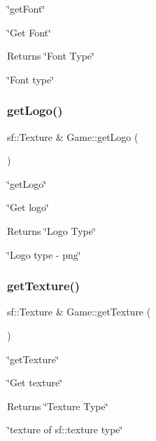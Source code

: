 \char`\"{}get\+Font\char`\"{} 

\char`\"{}\+Get Font\char`\"{}

\begin{DoxyReturn}{Returns}
\char`\"{}\+Font Type\char`\"{}

\char`\"{}\+Font type\char`\"{} 
\end{DoxyReturn}
\mbox{\label{classGame_a4eb607b287a0aa0238339454399edc8b}} 
\subsubsection{\texorpdfstring{get\+Logo()}{getLogo()}}
{\footnotesize\ttfamily sf\+::\+Texture \& Game\+::get\+Logo (\begin{DoxyParamCaption}{ }\end{DoxyParamCaption})}



\char`\"{}get\+Logo\char`\"{} 

\char`\"{}\+Get logo\char`\"{}

\begin{DoxyReturn}{Returns}
\char`\"{}\+Logo Type\char`\"{}

\char`\"{}\+Logo type -\/ png\char`\"{} 
\end{DoxyReturn}
\mbox{\label{classGame_aa231abe1d7a36b55599ca459c815b2a5}} 
\subsubsection{\texorpdfstring{get\+Texture()}{getTexture()}}
{\footnotesize\ttfamily sf\+::\+Texture \& Game\+::get\+Texture (\begin{DoxyParamCaption}{ }\end{DoxyParamCaption})}



\char`\"{}get\+Texture\char`\"{} 

\char`\"{}\+Get texture\char`\"{}

\begin{DoxyReturn}{Returns}
\char`\"{}\+Texture Type\char`\"{}

\char`\"{}texture of sf\+::texture type\char`\"{} 
\end{DoxyReturn}
\mbox{\label{classGame_a1ab78f5ed0d5ea879157357cf2fb2afa}} 

